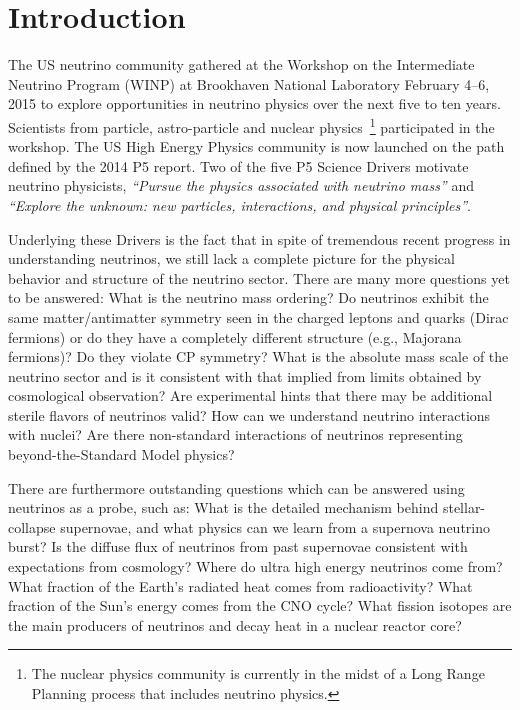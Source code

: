 \section{Introduction}
\label{sec:Introduction}


The US neutrino community gathered at the Workshop on the Intermediate
Neutrino Program (WINP) at Brookhaven National Laboratory February
4--6, 2015 to explore opportunities in neutrino physics over the next
five to ten years. Scientists from particle, astro-particle and
nuclear physics~\footnote{The nuclear physics community is currently
  in the midst of a Long Range Planning process that includes neutrino
  physics.}  participated in the workshop. The US High Energy Physics
community is now launched on the path defined by the 2014 P5 report.
Two of the five P5 Science Drivers motivate neutrino physicists,
\textit{``Pursue the physics associated with neutrino mass''} and
\textit{``Explore the unknown: new particles, interactions, and
  physical principles''}.

Underlying these Drivers is the fact that in spite of tremendous
recent progress in understanding neutrinos, we still lack a complete
picture for the physical behavior and structure of the
neutrino sector. There are many more questions yet to be answered:
What is the neutrino mass ordering? Do neutrinos exhibit the same
matter/antimatter symmetry seen in the charged leptons and quarks
(Dirac fermions) or do they have a completely different structure
(e.g., Majorana fermions)?  Do they violate CP symmetry?  What is the
absolute mass scale of the neutrino sector and is it consistent with
that implied from limits obtained by cosmological observation? Are
experimental hints that there may be additional sterile flavors of
neutrinos valid?  How can we understand neutrino interactions with
nuclei?  Are there non-standard interactions of neutrinos representing
beyond-the-Standard Model physics? 

There are furthermore outstanding questions which can be answered
using neutrinos as a probe, such as: What is the detailed mechanism
behind stellar-collapse supernovae, and what physics can we learn from
a supernova neutrino burst? Is the diffuse flux of neutrinos from past
supernovae consistent with expectations from cosmology?  Where do
ultra high energy neutrinos come from?  What fraction of the Earth's
radiated heat comes from radioactivity?  What fraction of the Sun's
energy comes from the CNO cycle?  What fission isotopes are the main
producers of neutrinos and decay heat in a nuclear reactor core?

